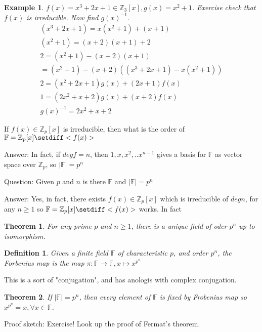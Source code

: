 \documentclass{article}
\newtheorem{thm}{Theorem}
\newtheorem{defn}{Definition}
\newtheorem{eg}{Example}
\begin{document}
\begin{eg}
    $f(x) = x^3 + 2x + 1\in\mathbb{Z}_3[x], g(x) = x^2 + 1$. Exercise check
    that $f(x)$ is irreducible. Now find $g(x)^{-1}$.
    \begin{align*}
        (x^3+2x+ 1) = x(x^2+1) + (x+1)\\
        (x^2 + 1) = (x+2)(x+1) + 2\\
        2 = (x^2+1) - (x+2)(x+1)\\
        = (x^2+1) - (x+2)((x^3+2x+ 1) - x(x^2+1))\\
        2 = (x^2 + 2x+ 1)g(x) + (2x+1)f(x)\\
        1 = (2x^2 + x  + 2)g(x) + (x+2)f(x)\\
        g(x)^{-1} = 2x^2 + x + 2
    \end{align*}
\end{eg}

If $f(x)\in\mathbb{Z}_p[x]$ is irreducible, then what is the order of $\mathbb{F} =
\mathbb{Z}_p[x]\setdiff<f(x)>$

Answer: In fact, if $deg f = n$, then $1,x,x^2,..x^{n-1}$ gives a basis for
$\mathbb{F}$ as vector space over $\mathbb{Z}_p$, so $|\mathbb{F}| = p^n$

Question: Given $p$ and $n$ is there $\mathbb{F}$ and $|\mathbb{F}| = p^n$

Answer: Yes, in fact, there exists $f(x) \in\mathbb{Z}_p[x]$ which is irreducible
of $deg n$, for any $n\geq 1$ so $\mathbb{F} = \mathbb{Z}_p[x]\setdiff<f(x)>$ works.
In fact
\begin{thm}
    For any prime $p$ and $n\geq 1$, there is a unique field of oder $p^n$ up to
    isomorphism.
\end{thm}

\begin{defn}
    Given a finite field $\mathbb{F}$ of characteristic $p$, and order $p^n$, the
    Forbenius map is the map $\pi:\mathbb{F}\rightarrow\mathbb{F}, x\mapsto x^{p^n}$
\end{defn}

This is a sort of "conjugation", and has anologis with complex conjugation.

\begin{thm}
    If $|\mathbb{F}| = p^n$, then every element of $\mathbb{F}$ is fixed by
    Frobenius map so $x^{p^n} = x, \forall x\in\mathbb{F}$.
\end{thm}

Proof sketch: Exercise! Look up the proof of Fermat's theorem.
\end{document}
